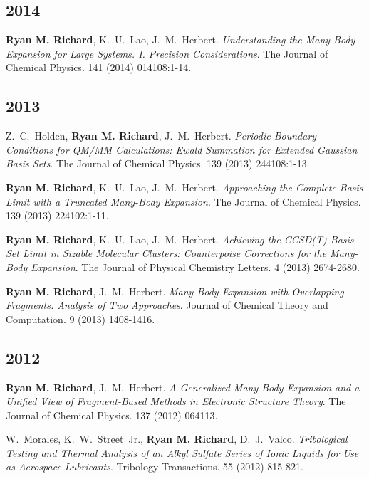 \documentclass[11pt,a4paper,sans]{moderncv}
\begin{document}
\begin{etaremune}
	\subsection{2014}

	\item{\textbf{Ryan M. Richard}, K.~U.~Lao, J.~M.~Herbert.  {\em Understanding the Many-Body Expansion for Large Systems.  I. Precision Considerations}.  The Journal of Chemical Physics.  141 (2014) 014108:1-14.}

	\subsection{2013}

	\item{Z.~C.~Holden, \textbf{Ryan M. Richard}, J.~M.~Herbert.  {\em Periodic Boundary Conditions for QM/MM Calculations: Ewald Summation for Extended Gaussian Basis Sets}.  The Journal of Chemical Physics.  139 (2013) 244108:1-13.}

	\item{\textbf{Ryan M. Richard}, K.~U.~Lao, J.~M.~Herbert.  {\em Approaching the Complete-Basis Limit with a Truncated Many-Body Expansion}.  The Journal of Chemical Physics.  139 (2013) 224102:1-11.}

	\item{\textbf{Ryan M. Richard}, K.~U.~Lao, J.~M.~Herbert.  {\em Achieving the CCSD(T) Basis-Set Limit in Sizable Molecular Clusters: Counterpoise Corrections for the Many-Body Expansion}.  The Journal of Physical Chemistry Letters.  4 (2013) 2674-2680.}

	\item{\textbf{Ryan M. Richard}, J.~M.~Herbert. {\em Many-Body Expansion with Overlapping Fragments: Analysis of Two Approaches}.  Journal of Chemical Theory and Computation.  9 (2013) 1408-1416.}

	\subsection{2012}

	\item{\textbf{Ryan M. Richard}, J.~M.~Herbert.  {\em A Generalized Many-Body Expansion and a Unified View of Fragment-Based Methods in Electronic Structure Theory}. The Journal of Chemical Physics. 137 (2012) 064113.}

	\item{W.~Morales, K.~W.~Street~Jr., \textbf{Ryan M. Richard}, D.~J.~Valco.  {\em Tribological Testing and Thermal Analysis of an Alkyl Sulfate Series of Ionic Liquids for Use as Aerospace Lubricants}.  Tribology Transactions.  55 (2012) 815-821.}

\end{etaremune}
\end{document}

